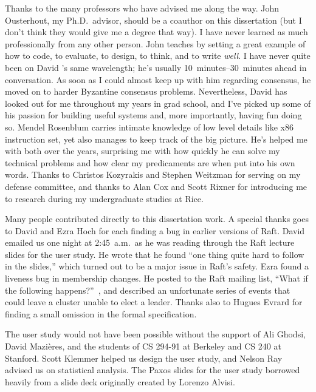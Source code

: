Thanks to the many professors who have advised me along the way. John
Ousterhout, my Ph.D.\ advisor, should be a coauthor on this dissertation
(but I don't think they would give me a degree that way). I have never
learned as much professionally from any other person. 
John teaches by setting a great example of how to
code, to evaluate, to design, to think, and to write \emph{well}.
I have never quite
been on David \mazieres{}'s same wavelength; he's usually
\SIrange{10}{30}{minutes}
ahead in conversation. As soon as I could almost keep up with him
regarding consensus, he moved on to harder Byzantine consensus problems.
Nevertheless, David has looked out for me throughout my years in grad
school, and I've picked up some of his passion for building useful
systems and, more importantly, having fun doing so.
Mendel Rosenblum carries intimate knowledge of low level details like
x86 instruction set, yet also manages to keep track of the big
picture. He's helped me with both over the years, surprising me
with how quickly he can solve my technical problems and how clear my
predicaments are when put into his own words. Thanks to Christos Kozyrakis
and Stephen Weitzman for serving on my defense committee, and thanks to
Alan Cox and Scott Rixner for introducing me to research during
my undergraduate studies at Rice.

Many people contributed directly to this dissertation work.
A special thanks goes to David \mazieres{} and Ezra Hoch for each
finding a bug in earlier versions of Raft. David emailed us one night at
2:45~a.m.\ as he was reading through the Raft lecture slides for the
user study. He wrote that he found ``one thing quite hard to follow in
the slides,'' which turned out to be a major issue in Raft's safety.
Ezra found a liveness bug in membership changes. He posted to the
Raft mailing list,
``What if the following happens?''~\cite{Hoch:2014}, and described an
unfortunate series of events that could leave a cluster unable to
elect a leader. Thanks also to Hugues Evrard for finding a small
omission in the formal specification.

The user study would not have been possible without the support of
Ali Ghodsi, David Mazi\`{e}res, and the students of CS 294-91 at
Berkeley and CS 240 at Stanford.
Scott Klemmer helped us design the user study,
and Nelson Ray advised us on statistical analysis.
The Paxos slides for the user study borrowed heavily from a slide
deck originally created by Lorenzo Alvisi.

